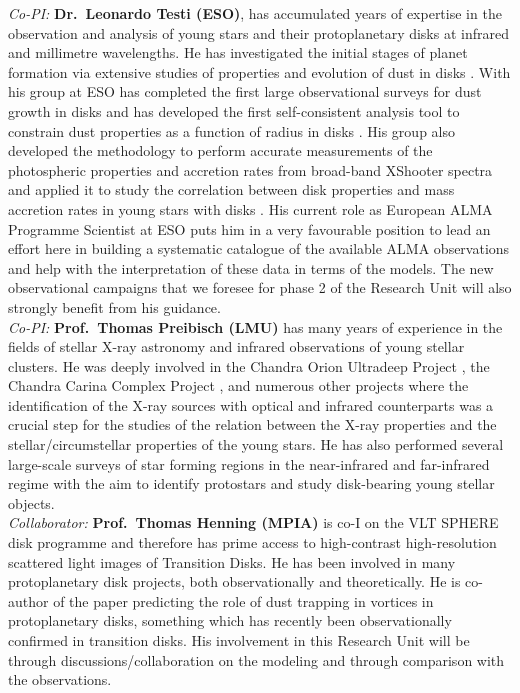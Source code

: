 \documentclass[10pt,fleqn,twoside]{article}
\begin{document}
{\it Co-PI:} {\bf Dr.\ Leonardo Testi (ESO)}, has accumulated years of expertise
in the observation and analysis of young stars and their protoplanetary
disks at infrared and millimetre wavelengths. He has investigated the initial stages of planet formation via
extensive studies of properties and evolution of dust in disks 
\citep{2003A&A...403..323T, 2014prpl.conf..339T}. 
With his group at ESO has completed the first large observational surveys for dust growth
in disks \citep{2010A&A...512A..15R, 2010A&A...521A..66R}
and has developed the first self-consistent analysis tool to constrain dust properties
as a function of radius in disks \citep{2011A&A...525A..12B, 2013A&A...558A..64T, 
2016A&A...588A..53T}.
His group also developed the methodology to perform accurate measurements of
the photospheric properties and accretion rates from broad-band XShooter
spectra \citep{2013A&A...551A.107M} and applied it to study the correlation
between disk properties and mass accretion rates in young stars with disks
\citep{2016A&A...591L...3M}.
His current role as European ALMA Programme Scientist at ESO
puts him in a very favourable position to lead an effort here in
building a systematic catalogue of the available ALMA observations and help with the interpretation of these data in terms of
the models. The new observational
campaigns that we foresee for phase 2 of the Research Unit will also
strongly 
benefit from his guidance. \\

{\it Co-PI:} {\bf Prof.\ Thomas Preibisch (LMU)}  has many years of experience in the
fields of stellar X-ray astronomy and infrared observations
of young stellar clusters.
He was deeply involved in the
Chandra Orion Ultradeep Project \citep[COUP, see][]{2005ApJS..160..401P},
the Chandra Carina Complex Project \citep[CCCP, see][]{2011ApJS..194...10P},
and numerous other projects where
the identification of the X-ray sources with optical
and infrared counterparts was a crucial step for the studies
of the relation between the X-ray properties and the stellar/circumstellar
properties of the young stars. He has also performed several large-scale 
surveys of star forming
regions in the near-infrared \citep[e.g.,][]{2011ApJS..194...10P,
2014A&A...572A.116P}
and far-infrared regime \citep[e.g.,][]{2012A&A...541A.132P}
with the aim to identify protostars and study disk-bearing young
stellar objects.\\

{\it Collaborator:} {\bf Prof.\ Thomas Henning (MPIA)}  is co-I
on the VLT SPHERE disk programme and therefore has prime access to
high-contrast high-resolution scattered light images of Transition
Disks. He has been involved in many protoplanetary disk projects, both
observationally and theoretically. He is co-author of the 
\citet{1997Icar..128..213K} paper predicting the role of dust trapping in vortices
in protoplanetary disks, something which has recently been 
observationally confirmed in transition disks. 
His involvement in this
Research Unit will be through discussions/collaboration on the
modeling and through comparison with the observations. \\
\end{document}
